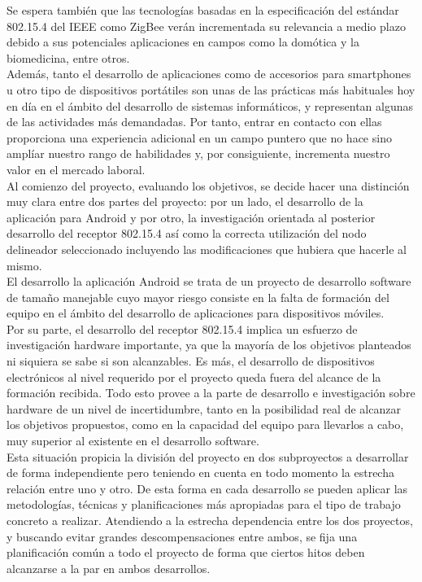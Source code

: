 	Se espera también que las tecnologías basadas en la especificación del estándar 802.15.4 del IEEE
	como ZigBee verán incrementada su relevancia a medio plazo debido a sus potenciales aplicaciones en
	campos como la domótica y la biomedicina, entre otros.\\

	Además, tanto el desarrollo de aplicaciones como de accesorios para smartphones u otro tipo de
	dispositivos portátiles son unas de las prácticas más habituales hoy en día en el ámbito del
	desarrollo de sistemas informáticos, y representan algunas de las actividades más demandadas. Por
	tanto, entrar en contacto con ellas proporciona una experiencia adicional en un campo puntero que
	no hace sino amplíar nuestro rango de habilidades y, por consiguiente, incrementa nuestro valor en 
	el mercado laboral.\\

	Al comienzo del proyecto, evaluando los objetivos, se decide hacer una distinción muy clara entre dos partes del proyecto: por un lado, el desarrollo de la aplicación para Android y por otro, la investigación orientada al posterior desarrollo del receptor 802.15.4 así como la correcta utilización del nodo delineador seleccionado incluyendo las modificaciones que hubiera que hacerle al mismo.\\

	El desarrollo la aplicación Android se trata de un proyecto de desarrollo software de tamaño manejable cuyo mayor riesgo consiste en la falta de formación del equipo en el ámbito del desarrollo de aplicaciones para dispositivos móviles.\\

	Por su parte, el desarrollo del receptor 802.15.4 implica un esfuerzo de investigación hardware importante, ya que la mayoría de los objetivos planteados ni siquiera se sabe si son alcanzables. Es más, el desarrollo de dispositivos electrónicos al nivel requerido por el proyecto queda fuera del alcance de la formación recibida. Todo esto provee a la parte de desarrollo e investigación sobre hardware de un nivel de incertidumbre, tanto en la posibilidad real de alcanzar los objetivos propuestos, como en la capacidad del equipo para llevarlos a cabo, muy superior al existente en el desarrollo software.\\

	Esta situación propicia la división del proyecto en dos subproyectos a desarrollar de forma independiente pero teniendo en cuenta en todo momento la estrecha relación entre uno y otro. De esta forma en cada desarrollo se pueden aplicar las metodologías, técnicas y planificaciones más apropiadas para el tipo de trabajo concreto a realizar. Atendiendo a la estrecha dependencia entre los dos proyectos, y buscando evitar grandes descompensaciones entre ambos, se fija una planificación común a todo el proyecto de forma que ciertos hitos deben alcanzarse a la par en ambos desarrollos.\\

